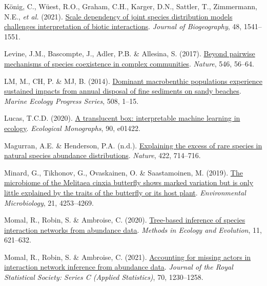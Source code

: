 \documentclass[9pt,biorxiv,doublespacing,lineno,endfloat]{lapreprint}
\newlength{\cslhangindent}
\newlength{\cslentryspacingunit} %
\newenvironment{CSLReferences}[2] %
 {%
  \setlength{\parindent}{0pt}
  \ifodd #1
  \let\oldpar\par
  \def\par{\hangindent=\cslhangindent\oldpar}
  \fi
  \setlength{\parskip}{#2\cslentryspacingunit}
 }%
 {}
\begin{document}
\begin{CSLReferences}{1}{0}
\leavevmode{}%
König, C., Wüest, R.O., Graham, C.H., Karger, D.N., Sattler, T.,
Zimmermann, N.E., \emph{et al.} (2021).
\href{https://doi.org/10.1111/jbi.14106}{Scale dependency of joint
species distribution models challenges interpretation of biotic
interactions}. \emph{Journal of Biogeography}, 48, 1541--1551.

\leavevmode{}%
Levine, J.M., Bascompte, J., Adler, P.B. \& Allesina, S. (2017).
\href{https://doi.org/10.1038/nature22898}{Beyond pairwise mechanisms of
species coexistence in complex communities}. \emph{Nature}, 546, 56--64.

\leavevmode{}%
LM, M., CH, P. \& MJ, B. (2014).
\href{https://www.int-res.com/abstracts/meps/v508/p1-15/}{Dominant
macrobenthic populations experience sustained impacts from annual
disposal of fine sediments on sandy beaches}. \emph{Marine Ecology
Progress Series}, 508, 1--15.

\leavevmode{}%
Lucas, T.C.D. (2020). \href{https://doi.org/10.1002/ecm.1422}{A
translucent box: interpretable machine learning in ecology}.
\emph{Ecological Monographs}, 90, e01422.

\leavevmode{}%
Magurran, A.E. \& Henderson, P.A. (n.d.).
\href{https://doi.org/10.1038/nature01547}{Explaining the excess of rare
species in natural species abundance distributions}. \emph{Nature}, 422,
714--716.

\leavevmode{}%
Minard, G., Tikhonov, G., Ovaskainen, O. \& Saastamoinen, M. (2019).
\href{https://doi.org/10.1111/1462-2920.14786}{The microbiome of the
Melitaea cinxia butterfly shows marked variation but is only little
explained by the traits of the butterfly or its host plant}.
\emph{Environmental Microbiology}, 21, 4253--4269.

\leavevmode{}%
Momal, R., Robin, S. \& Ambroise, C. (2020).
\href{https://doi.org/10.1111/2041-210X.13380}{Tree-based inference of
species interaction networks from abundance data}. \emph{Methods in
Ecology and Evolution}, 11, 621--632.

\leavevmode{}%
Momal, R., Robin, S. \& Ambroise, C. (2021).
\href{https://doi.org/10.1111/rssc.12509}{Accounting for missing actors
in interaction network inference from abundance data}. \emph{Journal of
the Royal Statistical Society: Series C (Applied Statistics)}, 70,
1230--1258.


\end{CSLReferences}
\end{document}
